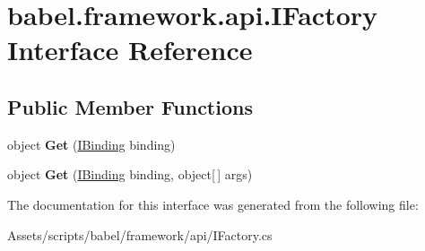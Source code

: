 \hypertarget{interfacebabel_1_1framework_1_1api_1_1_i_factory}{\section{babel.\-framework.\-api.\-I\-Factory Interface Reference}
\label{interfacebabel_1_1framework_1_1api_1_1_i_factory}
}
\subsection*{Public Member Functions}
\begin{DoxyCompactItemize}
\item 
\hypertarget{interfacebabel_1_1framework_1_1api_1_1_i_factory_a7f662dbd64b41086da6753c8f8b84fd1}{object {\bfseries Get} (\hyperlink{interfacebabel_1_1framework_1_1api_1_1_i_binding}{I\-Binding} binding)}\label{interfacebabel_1_1framework_1_1api_1_1_i_factory_a7f662dbd64b41086da6753c8f8b84fd1}

\item 
\hypertarget{interfacebabel_1_1framework_1_1api_1_1_i_factory_a29c73d96c1ddb1699e478d5d2004a065}{object {\bfseries Get} (\hyperlink{interfacebabel_1_1framework_1_1api_1_1_i_binding}{I\-Binding} binding, object\mbox{[}$\,$\mbox{]} args)}\label{interfacebabel_1_1framework_1_1api_1_1_i_factory_a29c73d96c1ddb1699e478d5d2004a065}

\end{DoxyCompactItemize}


The documentation for this interface was generated from the following file\-:\begin{DoxyCompactItemize}
\item 
Assets/scripts/babel/framework/api/I\-Factory.\-cs\end{DoxyCompactItemize}

